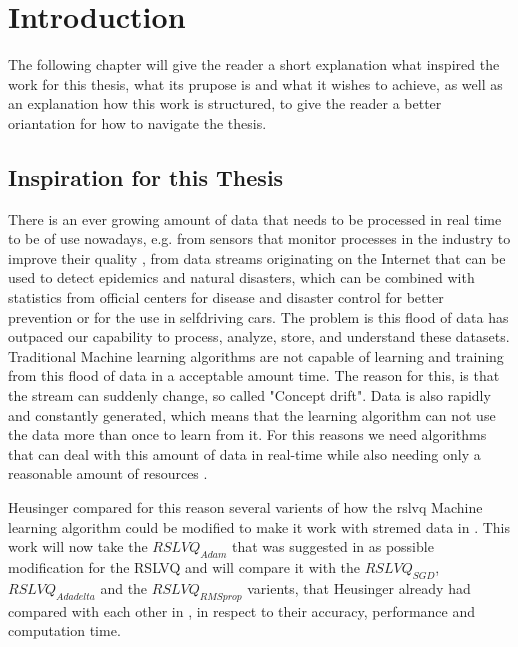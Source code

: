 \documentclass[12pt,oneside,a4paper,parskip]{scrbook}
\begin{document}
\tableofcontents	




\mainmatter

\chapter{Introduction}\label{ch:intro}

The following chapter will give the reader a short explanation what inspired the work for this thesis, what its prupose is 
and what it wishes to achieve, as well as an explanation how this work is structured, to give the reader a better oriantation 
for how to navigate the thesis.

\section{Inspiration for this Thesis} 
There is an ever growing amount of data that needs to be processed in real time to be of use nowadays, e.g. from sensors that 
monitor processes in the industry to improve their quality \cite{MLonDataStreams}, from data streams originating on 
the Internet that can be used to detect epidemics and natural disasters, which can be combined with statistics from 
official centers for disease and disaster control for better prevention \cite{MLonDataStreams} or for the use in selfdriving
cars.
The problem is this flood of data has outpaced our capability to process, analyze, store, and understand these datasets.
Traditional Machine learning algorithms are not capable of learning and training from this flood of data in a acceptable 
amount time. The reason for this, is that the stream can suddenly change, so called "Concept drift". Data is also 
rapidly and constantly generated, which means that the learning algorithm can not use the data more than once to learn 
from it.
For this reasons we need algorithms that can deal with this amount of data in real-time while also needing only a 
reasonable amount of resources \cite{MLonDataStreams}.

Heusinger compared for this reason several varients of how the \ac{rslvq} Machine learning algorithm could be modified
to make it work with stremed data in \cite{PassiveDriftonRSLVQ}.
This work will now take the $RSLVQ_\textit{Adam}$ that was suggested in \cite{overvieDiffRSLVQ} as possible modification 
for the RSLVQ and will compare it with the $RSLVQ_\textit{SGD}$, $RSLVQ_\textit{Adadelta}$ and the $RSLVQ_\textit{RMSprop}$ 
varients, that Heusinger already had compared with each other in \cite{PassiveDriftonRSLVQ},  
in respect to their accuracy, performance and computation time.
\end{document}
